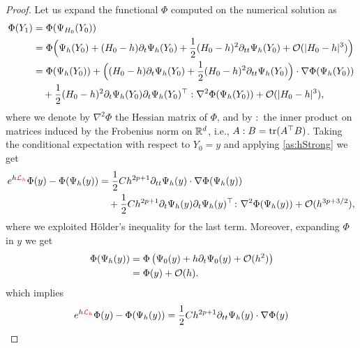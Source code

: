 \documentclass[10pt]{article}
\begin{document}
\begin{proof} Let us expand the functional $\Phi$ computed on the numerical solution as
	\begin{equation}\label{eq:TaylorNumericalSolution}
		\begin{aligned}
			\Phi(Y_1) &= \Phi(\Psi_{H_0}(Y_0)) \\
			&= \Phi\Big(\Psi_h(Y_0) + (H_0-h)\partial_t\Psi_h(Y_0) + \frac{1}{2}(H_0-h)^2\partial_{tt}\Psi_h(Y_0) + \mathcal{O}(\lvert H_0 - h\rvert^3)\Big)\\
			&= \Phi(\Psi_h(Y_0)) + \Big((H_0 - h)\partial_t\Psi_h(Y_0)+\frac{1}{2}(H_0-h)^2\partial_{tt}\Psi_h(Y_0)\Big) \cdot \nabla\Phi(\Psi_h(Y_0))\\
			&\quad + \frac{1}{2}(H_0 - h)^2 \partial_t \Psi_h(Y_0) \partial_t \Psi_h(Y_0)^\top : \nabla^2\Phi(\Psi_h(Y_0)) + \mathcal{O}(\lvert H_0 - h\rvert^3),
		\end{aligned}
	\end{equation}
	where we denote by $\nabla^2\Phi$ the Hessian matrix of $\Phi$, and by $:$ the inner product on matrices induced by the Frobenius norm on $\mathbb{R}^d$, i.e., $A : B = \operatorname{tr}(A^\top B)$. Taking the conditional expectation with respect to $Y_0 = y$ and applying \cref{as:hStrong} we get
	\begin{equation}\label{eq:TaylorNumericalSolution2}
		\begin{aligned}
			e^{h{\color{red}\mathcal{L}_h}}\Phi(y) - \Phi(\Psi_h(y)) &= \frac{1}{2} Ch^{2p+1}\partial_{tt}\Psi_h(y)\cdot \nabla\Phi(\Psi_h(y))\\
			&\quad + \frac{1}{2} Ch^{2p+1}\partial_t \Psi_h(y) \partial_t \Psi_h(y)^\top  \colon \nabla^2\Phi(\Psi_h(y)) + \mathcal{O}(h^{3p+3/2}),
		\end{aligned}
	\end{equation}
	where we exploited Hölder's inequality for the last term. Moreover, expanding $\Phi$ in $y$ we get
	\begin{equation}
		\begin{aligned}
			\Phi(\Psi_h(y)) &= \Phi\left(\Psi_0(y) + h\partial_t \Psi_0(y) + \mathcal{O}(h^2)\right) \\
			&= \Phi(y) + \mathcal{O}(h).
		\end{aligned}
	\end{equation}
	which implies
	\begin{equation}\label{eq:DistanceProbDet}
		\begin{aligned}
			e^{h\corr{\diffL_h}}\Phi(y) - \Phi(\Psi_h(y)) &= \frac{1}{2} Ch^{2p+1}\partial_{tt}\Psi_h(y) \cdot \nabla\Phi(y)\\

\end{aligned}
\end{equation}
\end{proof}
\end{document}
